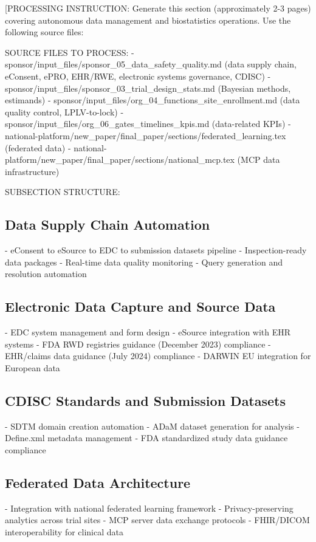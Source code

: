 
[PROCESSING INSTRUCTION: Generate this section (approximately 2-3 pages) covering
autonomous data management and biostatistics operations. Use the following source files:

SOURCE FILES TO PROCESS:
- sponsor/input\_files/sponsor\_05\_data\_safety\_quality.md (data supply chain, eConsent,
  ePRO, EHR/RWE, electronic systems governance, CDISC)
- sponsor/input\_files/sponsor\_03\_trial\_design\_stats.md (Bayesian methods, estimands)
- sponsor/input\_files/org\_04\_functions\_site\_enrollment.md (data quality control, LPLV-to-lock)
- sponsor/input\_files/org\_06\_gates\_timelines\_kpis.md (data-related KPIs)
- national-platform/new\_paper/final\_paper/sections/federated\_learning.tex (federated data)
- national-platform/new\_paper/final\_paper/sections/national\_mcp.tex (MCP data infrastructure)

SUBSECTION STRUCTURE:

\subsection{Data Supply Chain Automation}
- eConsent to eSource to EDC to submission datasets pipeline
- Inspection-ready data packages
- Real-time data quality monitoring
- Query generation and resolution automation

\subsection{Electronic Data Capture and Source Data}
- EDC system management and form design
- eSource integration with EHR systems
- FDA RWD registries guidance (December 2023) compliance
- EHR/claims data guidance (July 2024) compliance
- DARWIN EU integration for European data

\subsection{CDISC Standards and Submission Datasets}
- SDTM domain creation automation
- ADaM dataset generation for analysis
- Define.xml metadata management
- FDA standardized study data guidance compliance

\subsection{Federated Data Architecture}
- Integration with national federated learning framework
- Privacy-preserving analytics across trial sites
- MCP server data exchange protocols
- FHIR/DICOM interoperability for clinical data

